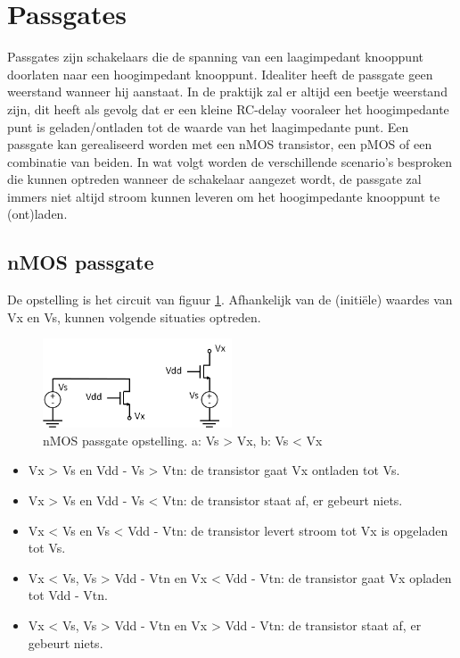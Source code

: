 \section{Passgates}
Passgates zijn schakelaars die de spanning van een laagimpedant knooppunt doorlaten naar een hoogimpedant knooppunt. Idealiter heeft de passgate geen weerstand wanneer hij aanstaat. In de praktijk zal er altijd een beetje weerstand zijn, dit heeft als gevolg dat er een kleine RC-delay vooraleer het hoogimpedante punt is geladen/ontladen tot de waarde van het laagimpedante punt.
Een passgate kan gerealiseerd worden met een nMOS transistor, een pMOS of een combinatie van beiden.
In wat volgt worden de verschillende scenario's besproken die kunnen optreden wanneer de schakelaar aangezet wordt, de passgate zal immers niet altijd stroom kunnen leveren om het hoogimpedante knooppunt te (ont)laden.

\subsection{nMOS passgate}
De opstelling is het circuit van figuur \ref{fig:passgate1}. Afhankelijk van de (initiële) waardes van Vx en Vs, kunnen volgende situaties optreden.

\begin{figure}[h!]
  \centering
  \includegraphics[width=0.5\textwidth]{../fig/hfdst-periphery-passgate1.png}
  \caption[nMOS passgate]{nMOS passgate opstelling. a: Vs > Vx, b: Vs < Vx}
  \label{fig:passgate1}
\end{figure}

\begin{itemize}
\item Vx > Vs en Vdd - Vs > Vtn: de transistor gaat Vx ontladen tot Vs.
\item Vx > Vs en Vdd - Vs < Vtn: de transistor staat af, er gebeurt niets.
\item Vx < Vs en Vs < Vdd - Vtn: de transistor levert stroom tot Vx is opgeladen tot Vs.
\item Vx < Vs, Vs > Vdd - Vtn en Vx < Vdd - Vtn: de transistor gaat Vx opladen tot Vdd - Vtn.
\item Vx < Vs, Vs > Vdd - Vtn en Vx > Vdd - Vtn: de transistor staat af, er gebeurt niets.
\end{itemize}

